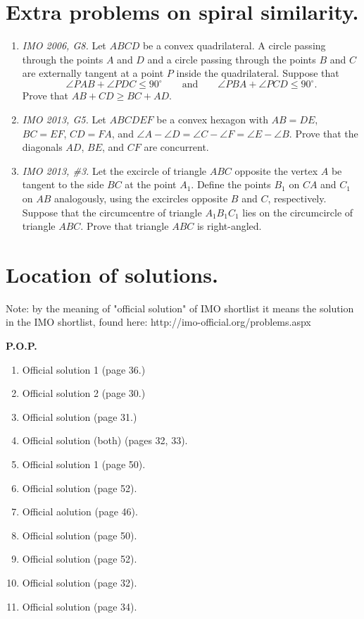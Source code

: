 \documentclass[11pt,a4paper]{article}
\begin{document}
\section {Extra problems on spiral similarity.}
\begin {enumerate}

\item\emph{IMO 2006, G8.} Let $ABCD$ be a convex quadrilateral. A circle passing through the points $A$ and $D$ and a circle passing through the points $B$ and $C$ are externally tangent at a point $P$ inside the quadrilateral. Suppose that \[\angle{PAB}+\angle{PDC}\leq 90^\circ\qquad\text{and}\qquad\angle{PBA}+\angle{PCD}\leq 90^\circ.\] Prove that $AB+CD \geq BC+AD$.

\item\emph {IMO 2013, G5.} Let $ABCDEF$ be a convex hexagon with $AB=DE$, $BC=EF$, $CD=FA$, and $\angle A-\angle D = \angle C -\angle F = \angle E -\angle B$. Prove that the diagonals $AD$, $BE$, and $CF$ are concurrent.

\item\emph {IMO 2013, \#3.} Let the excircle of triangle $ABC$ opposite the vertex $A$ be tangent to the side $BC$ at the point $A_1$. Define the points $B_1$ on $CA$ and $C_1$ on $AB$ analogously, using the excircles opposite $B$ and $C$, respectively. Suppose that the circumcentre of triangle $A_1B_1C_1$ lies on the circumcircle of triangle $ABC$. Prove that triangle $ABC$ is right-angled.

\end{enumerate}
\section{Location of solutions.}
Note: by the meaning of "official solution" of IMO shortlist it means the solution in the IMO shortlist, found here: http://imo-official.org/problems.aspx

\textbf {P.O.P.}
\begin{enumerate}
\item Official solution 1 (page 36.)
\item Official solution 2 (page 30.)
\item Official solution (page 31.)
\item Official solution (both) (pages 32, 33).
\item Official solution 1 (page 50).
\item Official solution (page 52).
\item Official aolution (page 46).
\item Official solution (page 50).
\item Official solution (page 52).
\item Official solution (page 32).
\item Official solution (page 34).
\end{enumerate}
\end{document}
